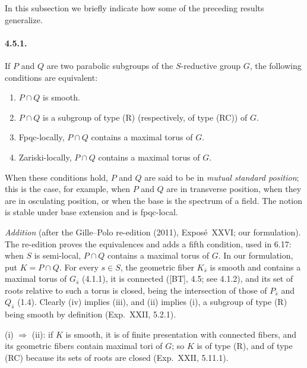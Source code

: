 
In this subsection we briefly indicate how some of the preceding
results generalize.

\paragraph{4.5.1.}
If \(P\) and \(Q\) are two parabolic subgroups of the \(S\)-reductive
group \(G\), the following conditions are equivalent:
\begin{enumerate}[label=\textup{(\roman*)}]
\item \(P\cap Q\) is smooth.
\item \(P\cap Q\) is a subgroup of type \textup{(R)} \textup{(respectively,
of type (RC))} of \(G\).
\item Fpqc-locally, \(P\cap Q\) contains a maximal torus of \(G\).
\item Zariski-locally, \(P\cap Q\) contains a maximal torus of \(G\).
\end{enumerate}
When these conditions hold, \(P\) and \(Q\) are said to be in
\emph{mutual standard position}; this is the case, for example, when
\(P\) and \(Q\) are in transverse position, when they are in osculating
position, or when the base is the spectrum of a field.  The notion is
stable under base extension and is fpqc-local.

\emph{Addition} (after the Gille--Polo re-edition (2011), Exposé~XXVI; our
formulation).  The re-edition proves the equivalences and adds a fifth
condition, used in 6.17: when \(S\) is semi-local, \(P\cap Q\) contains a
maximal torus of \(G\). In our formulation, put \(K=P\cap Q\). For every
\(s\in S\), the geometric fiber \(K_{\bar s}\) is smooth and contains a
maximal torus of \(G_{\bar s}\) (4.1.1), it is connected (\textup{[BT]},
4.5; see 4.1.2), and its set of roots relative to such a torus is closed,
being the intersection of those of \(P_{\bar s}\) and \(Q_{\bar s}\) (1.4).
Clearly (iv) implies (iii), and (ii) implies (i), a subgroup of type (R)
being smooth by definition (Exp.~XXII, 5.2.1).

(i) \(\Rightarrow\) (ii): if \(K\) is smooth, it is of finite presentation
with connected fibers, and its geometric fibers contain maximal tori of
\(G\); so \(K\) is of type (R), and of type (RC) because its sets of roots
are closed (Exp.~XXII, 5.11.1).

